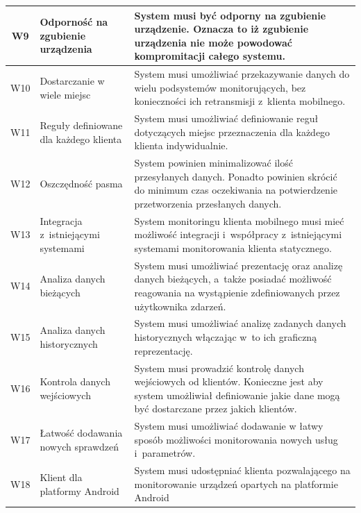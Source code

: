 \begin{longtable}[c]{|c||p{3.5cm}|p{9cm}|}
  W9 & \raggedright{Odporność na zgubienie urządzenia} & \raggedright{System musi być odporny na zgubienie urządzenie. Oznacza to iż zgubienie urządzenia nie może powodować kompromitacji całego systemu.} \tabularnewline
  \hline

  W10 & \raggedright{Dostarczanie w wiele miejsc} & \raggedright{System musi umożliwiać przekazywanie danych do wielu podsystemów monitorujących, bez konieczności ich retransmisji z~klienta mobilnego.} \tabularnewline
  \hline

  W11 & \raggedright{Reguły definiowane dla każdego klienta} & \raggedright{System musi umożliwiać definiowanie reguł dotyczących miejsc przeznaczenia dla każdego klienta indywidualnie.} \tabularnewline
  \hline

  W12 & \raggedright{Oszczędność pasma} & \raggedright{System powinien minimalizować ilość przesyłanych danych. Ponadto powinien skrócić do minimum czas oczekiwania na potwierdzenie przetworzenia przesłanych danych.} \tabularnewline
  \hline

  W13 & \raggedright{Integracja z~istniejącymi systemami} & \raggedright{System monitoringu klienta mobilnego musi mieć możliwość integracji i~współpracy z~istniejącymi systemami monitorowania klienta statycznego.} \tabularnewline
  \hline

  W14 & \raggedright{Analiza danych bieżących} & \raggedright{System musi umożliwiać prezentację oraz analizę danych bieżących, a~także posiadać możliwość reagowania na wystąpienie zdefiniowanych przez użytkownika zdarzeń.} \tabularnewline
  \hline

  W15 & \raggedright{Analiza danych historycznych} & \raggedright{System musi umożliwiać analizę zadanych danych historycznych włączając w~to ich graficzną reprezentację.} \tabularnewline
  \hline

  W16 & \raggedright{Kontrola danych wejściowych} & \raggedright{System musi prowadzić kontrolę danych wejściowych od klientów. Konieczne jest aby system umożliwiał definiowanie jakie dane mogą być dostarczane przez jakich klientów.} \tabularnewline
  \hline

  W17 & \raggedright{Łatwość dodawania nowych sprawdzeń} & \raggedright{System musi umożliwiać dodawanie w łatwy sposób możliwości monitorowania nowych usług i~parametrów.} \tabularnewline
  \hline

  W18 & \raggedright{Klient dla platformy Android} & \raggedright{System musi udostępniać klienta pozwalającego na monitorowanie urządzeń opartych na platformie Android} \tabularnewline
  \hline


\end{longtable}
